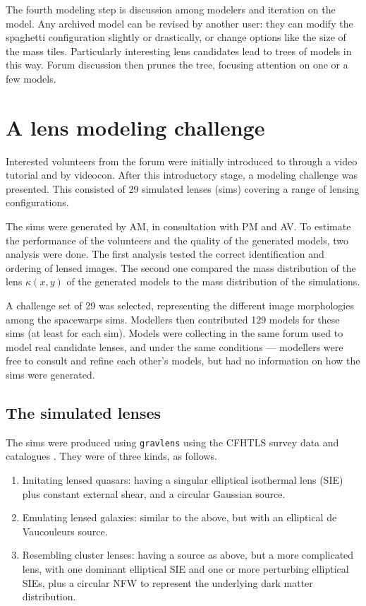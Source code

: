 The fourth modeling step is discussion among modelers and iteration
on the model.  Any archived model can be revised by another user: they
can modify the spaghetti configuration slightly or drastically, or
change options like the size of the mass tiles.  Particularly
interesting lens candidates lead to trees of models in this way.
Forum discussion then prunes the tree, focusing attention on one or a
few models.

\section{A lens modeling challenge} \label{sec:mod_challenge}

Interested volunteers from the \sw forum were initially introduced to
\spl through a video tutorial and by videocon.  After this
introductory stage, a modeling challenge was presented.  This
consisted of 29 simulated lenses (sims) covering a range of lensing
configurations.

The \sw sims were generated by AM, in consultation with PM and AV.
To estimate the performance of the volunteers and the quality of the generated models, two analysis  were done.
The first analysis tested the correct identification and ordering of lensed images.
The second one compared the mass distribution of the lens $\kappa(x, y)$ of the generated models to the mass distribution of the simulations.

A challenge set of 29 was selected, representing the different image
morphologies among the spacewarps sims.  Modellers then contributed
129 models for these sims (at least for each sim).  Models were
collecting in the same forum used to model real candidate lenses, and
under the same conditions --- modellers were free to consult and
refine each other's models, but had no information on how the sims
were generated.

\subsection{The simulated lenses} \label{sec:sims}

The sims were produced using {\tt gravlens}
\citep{2001astro.ph..2341K,2001astro.ph..2340K} using the CFHTLS survey data
and catalogues \cite{Coupon2009}. They were of three
kinds, as follows.

\begin{enumerate}
  \item Imitating lensed quasars: having a singular elliptical
    isothermal lens (SIE) plus constant external shear, and a circular
    Gaussian source.
  \item Emulating lensed galaxies: similar to the above, but with an
    elliptical de Vaucouleurs source.
  \item Resembling cluster lenses: having a source as above, but a
    more complicated lens, with one dominant elliptical SIE and
    one or more perturbing elliptical SIEs, plus a circular NFW
    \citep{1996ApJ...462..563N,1997ApJ...490..493N} to represent
    the underlying dark matter distribution.
\end{enumerate}

